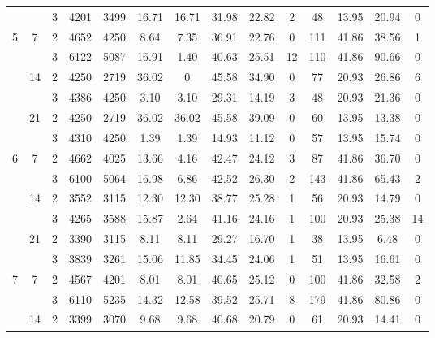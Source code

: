 \begin{tabular}{|ccc|ccc|ccc|ccc|c|c|}
  &    & 3 &  4201 &   3499 & 16.71 &   16.71 &   31.98 &   22.82 &    2 &   48 &   13.95 & 20.94 &     0 \\
\cline{1-14}
\cline{2-14}
\multirow{6}{*}{5} & \multirow{2}{*}{7} & 2 &  4652 &   4250 &  8.64 &    7.35 &   36.91 &   22.76 &    0 &  111 &   41.86 & 38.56 &     1 \\
  &    & 3 &  6122 &   5087 & 16.91 &    1.40 &   40.63 &   25.51 &   12 &  110 &   41.86 & 90.66 &     0 \\
\cline{2-14}
  & \multirow{2}{*}{14} & 2 &  4250 &   2719 & 36.02 &    0 &   45.58 &   34.90 &    0 &   77 &   20.93 & 26.86 &     6 \\
  &    & 3 &  4386 &   4250 &  3.10 &    3.10 &   29.31 &   14.19 &    3 &   48 &   20.93 & 21.36 &     0 \\
\cline{2-14}
  & \multirow{2}{*}{21} & 2 &  4250 &   2719 & 36.02 &   36.02 &   45.58 &   39.09 &    0 &   60 &   13.95 & 13.38 &     0 \\
  &    & 3 &  4310 &   4250 &  1.39 &    1.39 &   14.93 &   11.12 &    0 &   57 &   13.95 & 15.74 &     0 \\
\cline{1-14}
\cline{2-14}
\multirow{6}{*}{6} & \multirow{2}{*}{7} & 2 &  4662 &   4025 & 13.66 &    4.16 &   42.47 &   24.12 &    3 &   87 &   41.86 & 36.70 &     0 \\
  &    & 3 &  6100 &   5064 & 16.98 &    6.86 &   42.52 &   26.30 &    2 &  143 &   41.86 & 65.43 &     2 \\
\cline{2-14}
  & \multirow{2}{*}{14} & 2 &  3552 &   3115 & 12.30 &   12.30 &   38.77 &   25.28 &    1 &   56 &   20.93 & 14.79 &     0 \\
  &    & 3 &  4265 &   3588 & 15.87 &    2.64 &   41.16 &   24.16 &    1 &  100 &   20.93 & 25.38 &    14 \\
\cline{2-14}
  & \multirow{2}{*}{21} & 2 &  3390 &   3115 &  8.11 &    8.11 &   29.27 &   16.70 &    1 &   38 &   13.95 &  6.48 &     0 \\
  &    & 3 &  3839 &   3261 & 15.06 &   11.85 &   34.45 &   24.06 &    1 &   51 &   13.95 & 16.61 &     0 \\
\cline{1-14}
\cline{2-14}
\multirow{6}{*}{7} & \multirow{2}{*}{7} & 2 &  4567 &   4201 &  8.01 &    8.01 &   40.65 &   25.12 &    0 &  100 &   41.86 & 32.58 &     2 \\
  &    & 3 &  6110 &   5235 & 14.32 &   12.58 &   39.52 &   25.71 &    8 &  179 &   41.86 & 80.86 &     0 \\
\cline{2-14}
  & \multirow{2}{*}{14} & 2 &  3399 &   3070 &  9.68 &    9.68 &   40.68 &   20.79 &    0 &   61 &   20.93 & 14.41 &     0 \\

\end{tabular}
